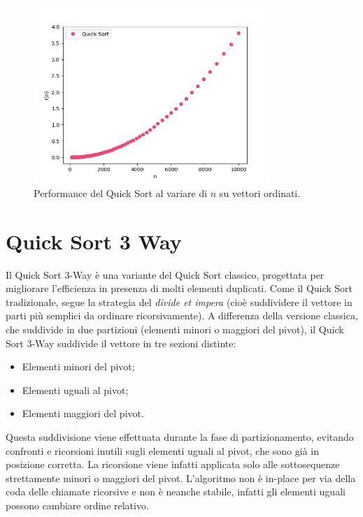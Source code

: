 \documentclass[a4paper, 12pt, oneside]{book}
\begin{document}
\begin{figure}[H]
    \centering
    \includegraphics[width=0.8\textwidth]{images/quickSortCasoPeggiore.png}
    \caption{Performance del Quick Sort al variare di \(n\) su vettori ordinati.}
    \label{fig:quick_sort_n}
\end{figure}


\chapter{Quick Sort 3 Way}\label{chap:Quick Sort 3 Way} %

Il Quick Sort 3-Way è una variante del Quick Sort classico, progettata per migliorare l'efficienza in presenza di molti elementi duplicati. Come il Quick Sort tradizionale, segue la strategia del \textit{divide et impera} (cioè suddividere il vettore in parti più semplici da ordinare ricorsivamente).
A differenza della versione classica, che suddivide in due partizioni (elementi minori o maggiori del pivot), il Quick Sort 3-Way suddivide il vettore in tre sezioni distinte:

\begin{itemize}
    \item Elementi minori del pivot;
    \item Elementi uguali al pivot;
    \item Elementi maggiori del pivot.
\end{itemize}

\noindent Questa suddivisione viene effettuata durante la fase di partizionamento, evitando confronti e ricorsioni inutili sugli elementi uguali al pivot, che sono già in posizione corretta. La ricorsione viene infatti applicata solo alle sottosequenze strettamente minori o maggiori del pivot.
L'algoritmo non è in-place per via della coda delle chiamate ricorsive e non è neanche stabile, infatti gli elementi uguali possono cambiare ordine relativo.
\end{document}

